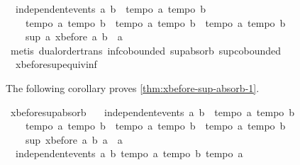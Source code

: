 \begin{isabellebody}
\ \ {\isachardoublequoteopen}independent{\isacharunderscore}events\ a\ b\ {\isasymLongrightarrow}\ {\isasymlbrakk}tempo{}\ a{\isacharsemicolon}\ tempo{}\ b{\isasymrbrakk}\ {\isasymLongrightarrow}\ \isanewline
\ \ \ \ {\isasymlbrakk}tempo{}\ a{\isacharsemicolon}\ tempo{}\ b{\isasymrbrakk}\ {\isasymLongrightarrow}\ {\isasymlbrakk}tempo{}\ a{\isacharsemicolon}\ tempo{}\ b{\isasymrbrakk}\ {\isasymLongrightarrow}\ {\isasymlbrakk}tempo{}\ a{\isacharsemicolon}\ tempo{}\ b{\isasymrbrakk}\ {\isasymLongrightarrow}\isanewline
\ \ \ \ sup\ a\ {\isacharparenleft}xbefore\ a\ b{\isacharparenright}\ {\isacharequal}\ a{\isachardoublequoteclose}\isanewline
%
\isadelimproof
%
\endisadelimproof
%
\isatagproof
{}\isamarkupfalse%
\ {\isacharparenleft}metis\ dual{\isacharunderscore}order{\isachardot}trans\ inf{\isachardot}cobounded{}\ sup{\isachardot}absorb{}\ sup{\isachardot}cobounded{}\ \isanewline
\ \ xbefore{\isacharunderscore}sup{\isacharunderscore}equiv{\isacharunderscore}inf{\isacharparenright}%
\endisatagproof
{\isafoldproof}%
%
\isadelimproof
%
\endisadelimproof
%
\begin{isamarkuptext}%
The following corollary proves \cref{thm:xbefore-sup-absorb-1}.%
\end{isamarkuptext}\isamarkuptrue%
\isamarkupfalse%
\ xbefore{\isacharunderscore}sup{\isacharunderscore}absorb{\isacharunderscore}{}{\isacharcolon}\ \isanewline
\ \ {\isachardoublequoteopen}independent{\isacharunderscore}events\ a\ b\ {\isasymLongrightarrow}\ {\isasymlbrakk}tempo{}\ a{\isacharsemicolon}\ tempo{}\ b{\isasymrbrakk}\ {\isasymLongrightarrow}\ \isanewline
\ \ \ \ {\isasymlbrakk}tempo{}\ a{\isacharsemicolon}\ tempo{}\ b{\isasymrbrakk}\ {\isasymLongrightarrow}\ {\isasymlbrakk}tempo{}\ a{\isacharsemicolon}\ tempo{}\ b{\isasymrbrakk}\ {\isasymLongrightarrow}\ {\isasymlbrakk}tempo{}\ a{\isacharsemicolon}\ tempo{}\ b{\isasymrbrakk}\ {\isasymLongrightarrow}\isanewline
\ \ \ \ sup\ {\isacharparenleft}xbefore\ a\ b{\isacharparenright}\ a\ {\isacharequal}\ a{\isachardoublequoteclose}\isanewline
%
\isadelimproof
%
\endisadelimproof
%
\isatagproof
{}\isamarkupfalse%
{\isacharminus}\isanewline
\ \ \isamarkupfalse%
\ {}{\isacharcolon}\ {\isachardoublequoteopen}independent{\isacharunderscore}events\ a\ b{\isachardoublequoteclose}\ {\isachardoublequoteopen}tempo{}\ a{\isachardoublequoteclose}\ {\isachardoublequoteopen}tempo{}\ b{\isachardoublequoteclose}\ {\isachardoublequoteopen}tempo{}\ a{\isachardoublequoteclose}\ \isanewline

\end{isabellebody}
